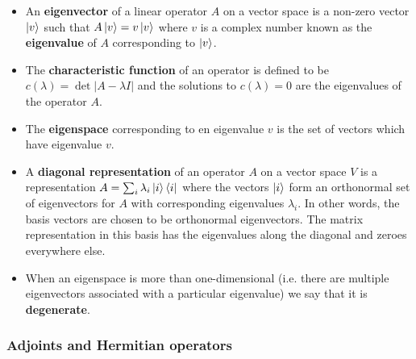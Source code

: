 \documentclass{article}
\begin{document}
\begin{itemize}
  \item An \textbf{eigenvector} of a linear operator $A$ on a vector space is a non-zero vector $\ket{v}$ such that $A \ket{v} = v \ket{v}$ where $v$ is a complex number known as the \textbf{eigenvalue} of $A$ corresponding to $\ket{v}$.

  \item The \textbf{characteristic function} of an operator is defined to be $c(\lambda) = \det |A - \lambda I|$ and the solutions to $c(\lambda) = 0$ are the eigenvalues of the operator $A$.

  \item The \textbf{eigenspace} corresponding to en eigenvalue $v$ is the set of vectors which have eigenvalue $v$.

  \item A \textbf{diagonal representation} of an operator $A$ on a vector space $V$ is a representation $A = \sum_i \lambda_i \ket{i} \bra{i}$ where the vectors $\ket{i}$ form an orthonormal set of eigenvectors for $A$ with corresponding eigenvalues $\lambda_i$. In other words, the basis vectors are chosen to be orthonormal eigenvectors. The matrix representation in this basis has the eigenvalues along the diagonal and zeroes everywhere else.

  \item When an eigenspace is more than one-dimensional (i.e. there are multiple eigenvectors associated with a particular eigenvalue) we say that it is \textbf{degenerate}.
\end{itemize}

\subsubsection{Adjoints and Hermitian operators}
\end{document}
